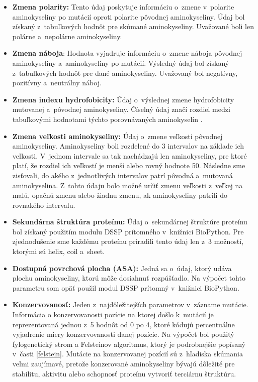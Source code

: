 \begin{itemize}
	\item \textbf{Zmena polarity:} Tento údaj poskytuje informáciu o~zmene v~polarite aminokyseliny po mutácií oproti polarite pôvodnej aminokyseliny. Údaj bol získaný z~tabuľkových hodnôt pre skúmané aminokyseliny. Uvažované boli len polárne a~nepolárne aminokyseliny.
	\item \textbf{Zmena náboja}: Hodnota vyjadruje informáciu o~zmene náboja pôvodnej aminokyseliny a~aminokyseliny po mutácií. Výsledný údaj bol získaný z~tabuľkových hodnôt pre dané aminokyseliny. Uvažovaný bol negatívny, pozitívny a~neutrálny náboj. 
	\item \textbf{Zmena indexu hydrofobicity:} Údaj o~výslednej zmene hydrofobicity mutovanej a~pôvodnej aminokyseliny. Číselný údaj značí rozdiel medzi tabuľkovými hodnotami týchto porovnávaných aminokyselín \cite{hydrophobicity}. 
	\item \textbf{Zmena veľkosti aminokyseliny:} Údaj o~zmene veľkosti pôvodnej aminokyseliny. Aminokyseliny boli rozdelené do 3 intervalov na základe ich veľkosti. V~jednom intervale sa tak nachádzajú len aminokyseliny, pre ktoré platí, že rozdiel ich veľkostí je menší alebo rovný hodnote 50. Následne sme zisťovali, do akého z~jednotlivých intervalov patrí pôvodná a~mutovaná aminokyselina. Z~tohto údaju bolo možné určiť zmenu veľkosti z~veľkej na malú, opačnú zmenu alebo žiadnu zmenu, ak aminokyseliny patrili do rovnakého intervalu.
	\item \textbf{Sekundárna štruktúra proteínu:} Údaj o~sekundárnej štruktúre proteínu bol získaný použitím modulu DSSP prítomného v~knižnici BioPython. Pre zjednodušenie sme každému proteínu priradili tento údaj len z~3 možností, ktorými sú helix, coil a sheet.
	\item \textbf{Dostupná povrchová plocha (ASA):} Jedná sa o~údaj, ktorý udáva plochu aminokyseliny, ktorú môže dosiahnuť rozpúšťadlo. Na výpočet tohto parametru som opäť použil modul DSSP prítomný v~knižnici BioPython.
	\item \textbf{Konzervovanosť:} Jeden z~najdôležitejších parametrov v~zázname mutácie. Informácia o konzervovanosti pozície na ktorej došlo k~mutácií je reprezentovaná
	jednou z~5 hodnôt od 0 po 4, ktoré kódujú percentuálne vyjadrenie miery konzervovanosti danej pozície. Na výpočet bol použitý fylogenetický strom a Felsteinov algoritmus, ktorý je podrobnejšie popísaný v~časti \ref{felstein}. Mutácie na konzervovanej pozícií sú z~hľadiska skúmania veľmi zaujímavé, pretože konzerované aminokyseliny bývajú dôležité pre stabilitu, aktivitu alebo schopnosť proteínu vytvoriť terciárnu štruktúru.

\end{itemize}
